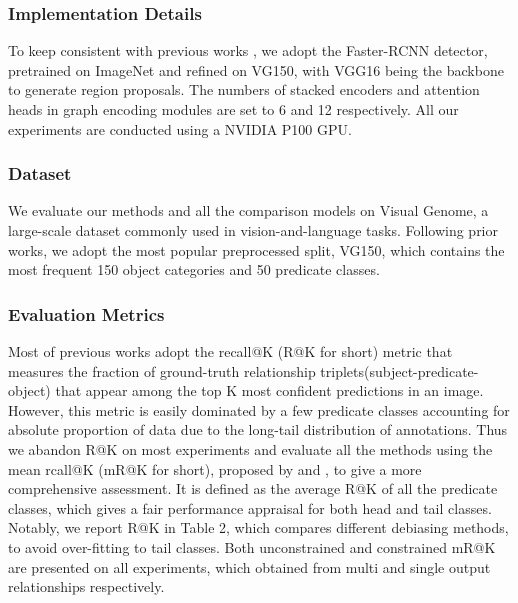 \documentclass[sigconf]{acmart}
\begin{document}
\subsubsection{Implementation Details}
To keep consistent with previous works \cite{xu17,zellers18,chen19,tang19}, we adopt the Faster-RCNN detector\cite{faster-rcnn}, pretrained on ImageNet\cite{imagenet} and refined on VG150\cite{xu17}, with VGG16\cite{VGG16} being the backbone to generate region proposals. The numbers of stacked encoders and attention heads in graph encoding modules are set to 6 and 12 respectively. All our experiments are conducted using a NVIDIA P100 GPU.

\subsubsection{Dataset}
We evaluate our methods and all the comparison models on Visual Genome\cite{krishna17}, a large-scale dataset commonly used in vision-and-language tasks. Following prior works\cite{xu17,zellers18,chen19,tang19}, we adopt the most popular preprocessed split, VG150\cite{xu17}, which contains the most frequent 150 object categories and 50 predicate classes.
\subsubsection{Evaluation Metrics}
Most of previous works adopt the recall@K (R@K for short) metric that measures the fraction of ground-truth relationship triplets(subject-predicate-object) that appear among the top K most confident predictions in an image\cite{xu17}. However, this metric is easily dominated by a few predicate classes accounting for absolute proportion of data due to the long-tail distribution of annotations. Thus we abandon R@K on most experiments and evaluate all the methods using the mean rcall@K (mR@K for short), proposed by \citet{chen19} and \citet{tang19}, to give a more comprehensive assessment. It is defined as the average R@K of all the predicate classes, which gives a fair performance appraisal for both head and tail classes. Notably, we report R@K in Table 2, which compares different debiasing methods, to avoid over-fitting to tail classes.
Both unconstrained and constrained \cite{zellers18} mR@K are presented on all experiments, which obtained from multi and single output relationships respectively.
\end{document}
